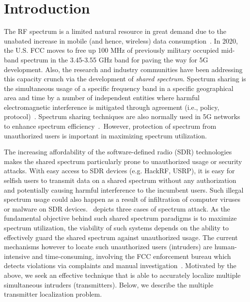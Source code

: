 \section{Introduction}
\label{sec:intro}

The RF spectrum is a limited natural resource in great demand due to the
unabated increase in mobile (and hence, wireless) data
consumption~\cite{andrews2014will,sigcomm21-5G}.
In 2020, the U.S. FCC moves to free up 100 MHz of previously military occupied mid-band spectrum in the 3.45-3.55 GHz band for paving the way for 5G development. 
Also, the research and industry communities have been addressing this capacity crunch via the development of {\em shared spectrum}.
Spectrum sharing is the simultaneous usage of a specific frequency band in a specific geographical area and time by a number of independent entities where harmful electromagnetic interference is mitigated through agreement (i.e., policy, protocol)~\cite{dod20-spectrum}. 
Spectrum sharing techniques are also normally used in 5G networks to enhance spectrum efficiency~\cite{survey-specshare}.~However, protection of spectrum from unauthorized
users is important in maximizing spectrum utilization.

The increasing affordability of the software-defined radio (SDR)
technologies makes the shared spectrum particularly prone to
unauthorized usage or security attacks. With easy access to SDR
devices (e.g. HackRF, USRP), it is easy for selfish users to transmit data
on a shared spectrum without any authorization and potentially causing
harmful interference to the incumbent users.  Such illegal spectrum
usage could also happen as a result of infiltration of computer viruses
or malware on SDR devices.~\cite{survey-specshare} depicts three cases of spectrum attack.
As the fundamental objective behind such
shared spectrum paradigms is to maximize spectrum utilization, the
viability of such systems depends on the ability to effectively guard
the shared spectrum against unauthorized usage.  The current
mechanisms however to locate such unauthorized users (intruders) are
human-intensive and time-consuming, involving the FCC enforcement bureau
which detects violations via complaints and manual
investigation~\cite{mobicom17-splot}. 
Motivated by the above, we seek an effective
technique that is able to accurately localize multiple simultaneous
intruders (transmitters). Below, we describe the multiple transmitter localization problem.

